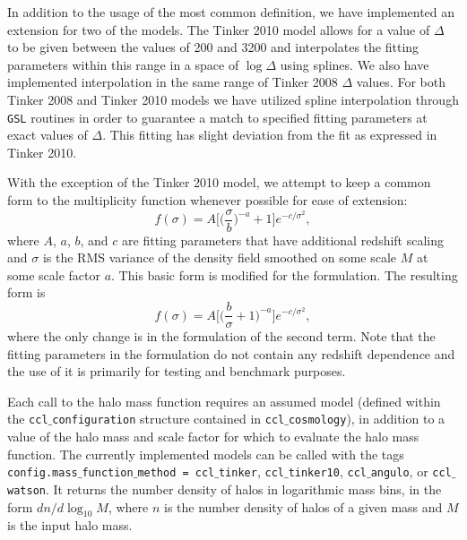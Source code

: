 \documentclass[\docopts]{\docclass}
\begin{document}
In addition to the usage of the most common definition, we have implemented an extension for two of the models. The Tinker 2010 model allows for a value of $\Delta$ to be given between the values of 200 and 3200 and interpolates the fitting parameters within this range in a space of $\log \Delta$ using splines. We also have implemented interpolation in the same range of Tinker 2008 $\Delta$ values. For both Tinker 2008 and Tinker 2010 models we have utilized spline interpolation through {\tt GSL} routines in order to guarantee a match to specified fitting parameters at exact values of $\Delta$. This fitting has slight deviation from the fit as expressed in Tinker 2010.


With the exception of the Tinker 2010 model, we attempt to keep a common form to the multiplicity function whenever possible for ease of extension:
\begin{equation}
f(\sigma)=A\Big[\Big(\frac{\sigma}{b}\Big)^{-a}+1\Big]e^{-c/{\sigma}^2},
\end{equation}
where $A$, $a$, $b$, and $c$ are fitting parameters that have additional redshift scaling and $\sigma$ is the RMS variance of the density field smoothed on some scale $M$ at some scale factor $a$. This basic form is modified for the \citet{Angulo2012} formulation. The resulting form is
\begin{equation}
f(\sigma)=A\Big[\Big(\frac{b}{\sigma}+1\Big)^{-a}\Big]e^{-c/{\sigma}^2},
\end{equation}
where the only change is in the formulation of the second term. Note that the fitting parameters in the \citet{Angulo2012} formulation do not contain any redshift dependence and the use of it is primarily for testing and benchmark purposes.

Each call to the halo mass function requires an assumed model (defined within the {\tt ccl$\_$configuration} structure contained in {\tt ccl$\_$cosmology}), in addition to a value of the halo mass and scale factor for which to evaluate the halo mass function. The currently implemented models can be called with the tags {\tt config.mass$\_$function$\_$method = ccl$\_$tinker}, {\tt ccl$\_$tinker10}, {\tt ccl$\_$angulo}, or {\tt ccl$\_$watson}. It returns the number density of halos in logarithmic mass bins, in the form $dn/d\log_{10}{M}$, where $n$ is the number density of halos of a given mass and $M$ is the input halo mass.
\end{document}
